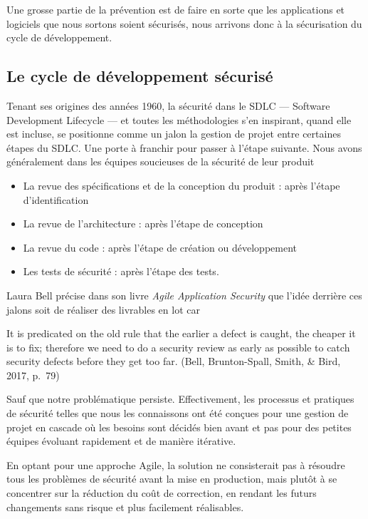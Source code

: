 \documentclass[
  11pt,
  a4paper,
  krantz2,
  11pt,
  oneside]{krantz}
\renewenvironment{quote}{\begin{VF}}{\end{VF}}
\begin{document}
Une grosse partie de la prévention est de faire en sorte que les applications et logiciels que nous sortons soient sécurisés, nous arrivons donc à la sécurisation du cycle de développement.

\subsection{Le cycle de développement sécurisé}\label{le-cycle-de-duxe9veloppement-suxe9curisuxe9}

Tenant ses origines des années 1960, la sécurité dans le SDLC --- Software Development Lifecycle --- et toutes les méthodologies s'en inspirant, quand elle est incluse, se positionne comme un jalon la gestion de projet entre certaines étapes du SDLC. Une porte à franchir pour passer à l'étape suivante. Nous avons généralement dans les équipes soucieuses de la sécurité de leur produit

\begin{itemize}
\item
  La revue des spécifications et de la conception du produit : après l'étape d'identification
\item
  La revue de l'architecture : après l'étape de conception
\item
  La revue du code : après l'étape de création ou développement
\item
  Les tests de sécurité : après l'étape des tests.
\end{itemize}

Laura Bell précise dans son livre \emph{Agile Application Security} que l'idée derrière ces jalons soit de réaliser des livrables en lot car

\begin{quote}
It is predicated on the old rule that the earlier a defect is caught, the cheaper it is to fix; therefore we need to do a security review as early as possible to catch security defects before they get too far. (Bell, Brunton-Spall, Smith, \& Bird, 2017, p.~79)
\end{quote}

Sauf que notre problématique persiste. Effectivement, les processus et pratiques de sécurité telles que nous les connaissons ont été conçues pour une gestion de projet en cascade où les besoins sont décidés bien avant et pas pour des petites équipes évoluant rapidement et de manière itérative.

En optant pour une approche Agile, la solution ne consisterait pas à résoudre tous les problèmes de sécurité avant la mise en production, mais plutôt à se concentrer sur la réduction du coût de correction, en rendant les futurs changements sans risque et plus facilement réalisables.
\end{document}
